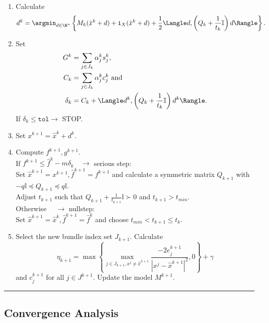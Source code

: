 \begin{enumerate}
	\item Calculate \[d^k = \argmin_{d \in \R^n} \left\{ M_k(\hat{x}^k+d)+\mathtt{i}_X(\hat{x}^k+d)+\frac{1}{2}\Langle d,\left(Q_k+\frac{1}{t_k}\mathbb{I}\right)d\Rangle\right\}.\]
	\item Set %
		\begin{align*} 
		  G^k &= \sum_{j \in J_k}{\alpha_j^k s_j^k}, \\ %
			C_k &= \sum_{j \in J_k}{\alpha_j^k c_j^k} \text{ and} \\
	    \delta_k &=  C_k + \Langle d^k,\left(Q_k+\frac{1}{t_k}\mathbb{I}\right)d^k\Rangle.
		\end{align*}
		If \(\delta_k \leq \mathtt{tol} \rightarrow \) STOP.
	\item Set \( x^{k+1} = \hat{x}^k + d^k \).
	\item Compute \(f^{k+1}, g^{k+1}\). \\
	If \(f^{k+1} \leq \hat{f}^k - m\delta_k \quad \rightarrow \) serious step: \\
	\noindent\hspace*{2em}%
	Set \(\hat{x}^{k+1} = x^{k+1}, \hat{f}^{k+1} = {f}^{k+1}\) and calculate a symmetric matrix \(Q_{k+1}\) with \(-q\mathbb{I} \preccurlyeq Q_{k+1} \preccurlyeq q\mathbb{I}\). \\
	Adjust \(t_{k+1}\) such that \(Q_{k+1}+\frac{1}{t_{k+1}}\mathbb{I} \succ 0\) and \(t_{k+1} > t_{min}\).\\
	Otherwise \(\quad \rightarrow\) nullstep: \\
	\noindent\hspace*{2em}%
	Set \(\hat{x}^{k+1} = \hat{x}^k, \hat{f}^{k+1}=\hat{f}^{k}\) and choose \(t_{min} < t_{k+1} \leq t_k\). 	
	\item Select the new bundle index set \(J_{k+1}\). Calculate 
	\[ \eta_{k+1} = \max{\left\{\max_{j \in J_{k+1}, x^j \neq \hat{x}^{k+1}}{\frac{-2e_j^{k+1}}{|x^j - \hat{x}^{k+1}|^2}, 0}\right\}}+\gamma  \]
	and \(c^{k+1}_j \) for all \(j \in J^{k+1}\). Update the model \(M^{k+1}\).
\end{enumerate}
\vspace{1ex}
\hrule

\vspace{1.5em}

\subsection{Convergence Analysis}

